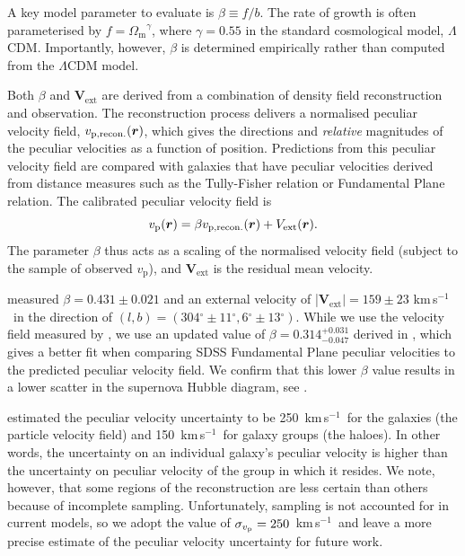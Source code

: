 \documentclass[
  journal=pasa,
  manuscript=research-paper,
  year=2022,
]{cup-journal}
\newcommand{\om}{\ensuremath{\Omega_{\text{m}}}}
\newcommand\dg{\ensuremath{^{\circ}}}
\newcommand{\Vext}{\ensuremath{\bm{V}_{\text{ext}}}}
\newcommand{\vp}{\ensuremath{v_{\text{p}}}}
\newcommand{\kms}{km\,s$^{-1}$}
\begin{document}
A key model parameter to evaluate is $\beta\equiv f/b$.
The rate of growth is often parameterised by $f=\om^\gamma$, where $\gamma=0.55$ in the standard cosmological model, $\Lambda$CDM.
Importantly, however, $\beta$ is determined empirically rather than computed from the $\Lambda$CDM model.

Both $\beta$ and \Vext{} are derived from a combination of density field reconstruction and observation.
The reconstruction process delivers a normalised peculiar velocity field, $v_{\rm p,recon.}(\bm{r})$, which gives the directions and {\em relative} magnitudes of the peculiar velocities as a function of position.
Predictions from this peculiar velocity field are compared with galaxies that have peculiar velocities derived from distance measures such as the Tully-Fisher relation or Fundamental Plane relation. 
The calibrated peculiar velocity field is
\begin{equation}\label{eq:vp_beta_Vext}
v_{\rm p}(\bm{r}) = \beta v_{\rm p,recon.}(\bm{r}) + V_{\text{ext}}(\bm{r}).
\end{equation}
The parameter $\beta$ thus acts as a scaling of the normalised velocity field (subject to the sample of observed \vp{}), and \Vext{} is the residual mean velocity.

\cite{Carrick2015} measured $\beta=0.431\pm0.021$ and an external velocity of |\Vext{}$| = 159\pm23$ \kms\ in the direction of $(l, b) = (304\dg\pm11\dg, 6\dg\pm13\dg)$.  
While we use the velocity field measured by \citet{Carrick2015}, we use an updated value of $\beta=0.314^{+0.031}_{-0.047}$ derived in \citet{Said2020}, which gives a better fit when comparing SDSS Fundamental Plane peculiar velocities to the predicted peculiar velocity field.  
We confirm that this lower $\beta$ value results in a lower scatter in the supernova Hubble diagram, see \citet{Peterson2021}.  

\cite{Carrick2015} estimated the peculiar velocity uncertainty to be 250~\kms\ for the galaxies (the particle velocity field) and 150~\kms\ for galaxy groups (the haloes).  
In other words, the uncertainty on an individual galaxy's peculiar velocity is higher than the uncertainty on peculiar velocity of the group in which it resides.  
We note, however, that some regions of the reconstruction are less certain than others because of incomplete sampling.  
Unfortunately, sampling is not accounted for in current models, so we adopt the value of $\sigma_{v_{\rm p}}=250$~\kms\ and leave a more precise estimate of the peculiar velocity uncertainty for future work. 
\end{document}
